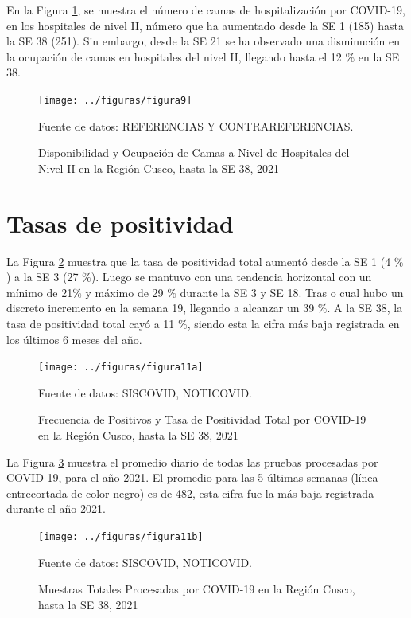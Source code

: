 \documentclass[12pt,a4paper,openany]{book}
\begin{document}
	En la Figura \ref{fig:ocupacion_2nivel}, se muestra el número de camas de hospitalización por COVID-19, en los hospitales de nivel II, número que ha aumentado desde la SE 1 (185) hasta la SE 38 (251). Sin embargo, desde la SE 21 se ha observado una disminución en la ocupación de camas en hospitales del nivel II, llegando hasta el 12 $\%$ en la SE 38.
	
	\begin{figure}[h]
	\caption{Disponibilidad y Ocupación de Camas a Nivel de Hospitales del Nivel II en la Región Cusco, hasta la SE 38, 2021}\label{fig:ocupacion_2nivel}
	\begin{center}
		\texttt{[image: ../figuras/figura9]}
	\end{center}
	{\footnotesize {Fuente de datos: REFERENCIAS Y CONTRAREFERENCIAS.}}
	\end{figure}

\clearpage

	\section*{Tasas de positividad}
	\noindent  La Figura \ref{fig:tasa_positividad} muestra que la tasa de positividad total aumentó desde la SE 1 (4 $\%$) a la SE 3 (27 $\%$). Luego se mantuvo con una tendencia horizontal con un mínimo de 21$\%$ y máximo de 29 $\%$ durante la SE 3 y SE 18. Tras o cual hubo un discreto incremento en la semana 19, llegando a alcanzar un 39 $\%$. A la SE 38, la tasa de positividad total cayó a 11 $\%$, siendo esta la cifra más baja registrada en los últimos 6 meses del año.

	\begin{figure}[h]
	\caption{Frecuencia de Positivos y Tasa de Positividad Total por COVID-19 en la Región Cusco, hasta la SE 38, 2021  }\label{fig:tasa_positividad}
	\begin{center}
		\texttt{[image: ../figuras/figura11a]}
	\end{center}
	{\footnotesize {Fuente de datos: SISCOVID, NOTICOVID.}}
	\end{figure}

	La Figura \ref{fig:total_muestras_procesada} muestra el promedio diario de todas las pruebas procesadas por COVID-19, para el año 2021. El promedio para las 5 últimas semanas (línea entrecortada de color negro) es de 482, esta cifra fue la más baja registrada durante el año 2021.
 
	\begin{figure}[h]
	\caption{Muestras Totales Procesadas por COVID-19 en la Región Cusco, hasta la SE 38, 2021}\label{fig:total_muestras_procesada}
	\begin{center}
		\texttt{[image: ../figuras/figura11b]}
	\end{center}
	{\footnotesize {Fuente de datos: SISCOVID, NOTICOVID.}}
	\end{figure}
\end{document}
